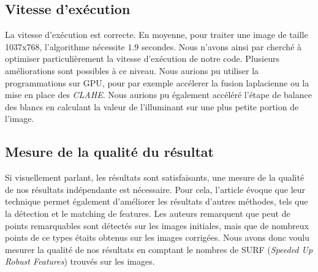 \documentclass[twoside]{article}
\begin{document}
\begin{multicols}{2}
\subsection{Vitesse d'exécution}
La vitesse d'exécution est correcte. En moyenne, pour traiter une image de taille 1037x768, l'algorithme nécessite $1.9$ secondes. Nous n'avons ainsi par cherché à optimiser particulièrement la vitesse d'exécution de notre code. Plusieurs améliorations sont possibles à ce niveau. Nous aurions pu utiliser la programmations sur GPU, pour par exemple accélerer la fusion laplacienne ou la mise en place des \emph{CLAHE}. Nous aurions pu également accéléré l'étape de balance des blancs en calculant la valeur de l'illuminant sur une plus petite portion de l'image.

\subsection{Mesure de la qualité du résultat}
Si visuellement parlant, les résultats sont satisfaisants, une mesure de la qualité de nos résultats indépendante est nécessaire. Pour cela, l'article évoque que leur technique permet également d'améliorer les résultats d'autres méthodes, tels que la détection et le matching de features. Les auteurs remarquent que peut de points remarquables sont détectés sur les images initiales, mais que de nombreux points de ce types étaits obtenus sur les images corrigées. Nous avons donc voulu mesurer la qualité de nos résultats en comptant le nombres de SURF (\emph{Speeded Up Robust Features}) trouvés sur les images.


\end{multicols}
\end{document}

